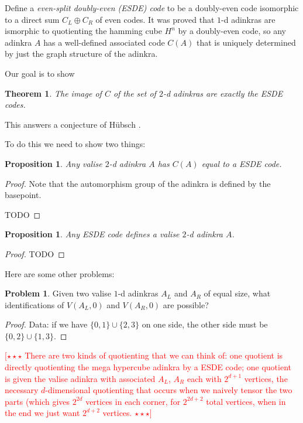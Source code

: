 \documentclass[12pt,twoside,singlespace]{article}
\numberwithin{equation}{section}
\newtheorem{thm}[equation]{Theorem}
\newtheorem{prop}[equation]{Proposition}
\theoremstyle{definition}
\newtheorem{prob}{Problem}
\newcommand{\com}[1]{\textcolor{red}{$[\star \star \star$ #1 $\star \star \star]$}}
\begin{document}
Define a \emph{even-split doubly-even (ESDE) code} to be a doubly-even code isomorphic to a direct sum $C_L \oplus C_R$ of even codes. It was proved \cite{blah} that $1$-d adinkras are ismorphic to quotienting the hamming cube $H^n$ by a doubly-even code, so any adinkra $A$ has a well-defined associated code $C(A)$ that is uniquely determined by just the graph structure of the adinkra.

Our goal is to show
\begin{thm}
The image of $C$ of the set of $2$-d adinkras are exactly the ESDE codes.
\end{thm}

This answers a conjecture of H\"{u}bsch \cite{}.

To do this we need to show two things:

\begin{prop}
Any valise $2$-d adinkra $A$ has $C(A)$ equal to a ESDE code.
\end{prop}
\begin{proof}

Note that the automorphism group of the adinkra is defined by the basepoint.

TODO
\end{proof}

\begin{prop}
Any ESDE code defines a valise $2$-d adinkra $A$.
\end{prop}
\begin{proof}
TODO
\end{proof}

Here are some other problems:
\begin{prob}
Given two valise $1$-d adinkras $A_L$ and $A_R$ of equal size, what identifications of $V(A_L, 0)$ and $V(A_R, 0)$ are possible?
\end{prob}
\begin{proof}
Data: if we have $\{0,1\} \cup \{2,3\}$ on one side, the other side must be $\{0,2\} \cup \{1, 3\}$.
\end{proof}

\com{There are two kinds of quotienting that we can think of: one quotient is directly quotienting the mega hypercube adinkra by a ESDE code; one quotient is given the valise adinkra with associated $A_L$, $A_R$ each with $2^{d+1}$ vertices, the necessary $d$-dimensional quotienting that occurs when we naively tensor the two parts (which gives $2^{2d}$ vertices in each corner, for $2^{2d+2}$ total vertices, when in the end we just want $2^{d+2}$ vertices.}
\end{document}
